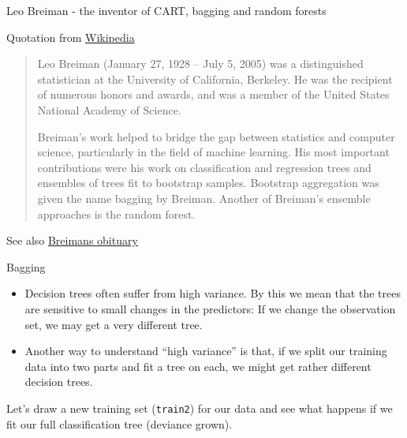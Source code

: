 \documentclass[10pt,ignorenonframetext,]{beamer}
\begin{document}
\begin{frame}

\begin{block}{Leo Breiman - the inventor of CART, bagging and random
forests}

\vspace{1mm} Quotation from
\href{https://en.wikipedia.org/wiki/Leo_Breiman}{Wikipedia} \vspace{1mm}

\begin{quote}
Leo Breiman (January 27, 1928 – July 5, 2005) was a distinguished statistician at the University of California, Berkeley. He was the recipient of numerous honors and awards, and was a member of the United States National Academy of Science.

Breiman's work helped to bridge the gap between statistics and computer science, particularly in the field of machine learning. His most important contributions were his work on classification and regression trees and ensembles of trees fit to bootstrap samples. Bootstrap aggregation was given the name bagging by Breiman. Another of Breiman's ensemble approaches is the random forest.
\end{quote}

See also
\href{https://www.berkeley.edu/news/media/releases/2005/07/07_breiman.shtml}{Breimans
obituary}

\end{block}

\end{frame}

\begin{frame}[fragile]{Bagging}

\vspace{2mm}

\begin{itemize}
\item
  Decision trees often suffer from high variance. By this we mean that
  the trees are sensitive to small changes in the predictors: If we
  change the observation set, we may get a very different tree.
\item
  Another way to understand ``high variance'' is that, if we split our
  training data into two parts and fit a tree on each, we might get
  rather different decision trees.
\end{itemize}

\vspace{2mm}

Let's draw a new training set (\texttt{train2}) for our data and see
what happens if we fit our full classification tree (deviance grown).

\end{frame}
\end{document}
